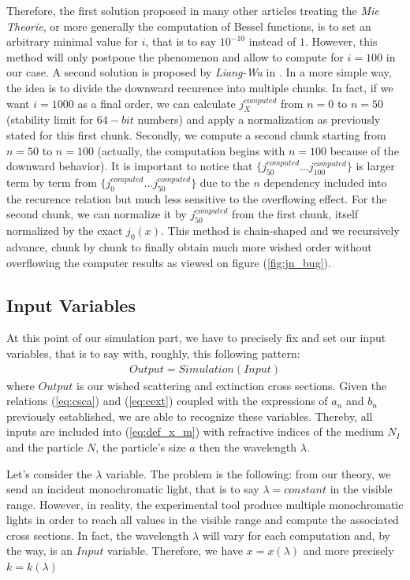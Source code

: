 \documentclass{article}
\numberwithin{equation}{section}
\begin{document}
Therefore, the first solution proposed in many other articles treating the \textit{Mie Theorie}, or more generally the computation of Bessel functions, is to set an arbitrary minimal value for $i$, that is to say $10^{-10}$ instead of $1$. However, this method will only postpone the phenomenon and allow to compute for $i=100$ in our case. A second solution is proposed by \textit{Liang-Wu} in \cite{liangwu}. In a more simple way, the idea is to divide the downward recurence into multiple chunks. In fact, if we want $i=1000$ as a final order, we can calculate $j^{computed}_{X}$ from $n=0$ to $n=50$ (stability limit for $64-bit$ numbers) and apply a normalization as previously stated for this first chunk. Secondly, we compute a second chunk starting from $n=50$ to $n=100$ (actually, the computation begins with $n=100$ because of the downward behavior). It is important to notice that $\{j^{computed}_{50}...j^{computed}_{100}\}$ is larger term by term from $\{j^{computed}_{0}...j^{computed}_{50}\}$ due to the $n$ dependency included into the recurence relation but much less sensitive to the overflowing effect. For the second chunk, we can normalize it by $j^{computed}_{50}$ from the first chunk, itself normalized by the exact $j_{0}(x)$. This method is chain-shaped and we recursively advance, chunk by chunk to finally obtain much more wished order without overflowing the computer results as viewed on figure (\ref{fig:jn_bug}).

\subsection{Input Variables}

At this point of our simulation part, we have to precisely fix and set our input variables, that is to say with, roughly, this following pattern:
\begin{align}
Output = Simulation(Input)
\end{align}
where $Output$ is our wished scattering and extinction cross sections. Given the relations (\ref{eq:csca}) and (\ref{eq:cext}) coupled with the expressions of $a_{n}$ and $b_{n}$ previously established, we are able to recognize these variables. Thereby, all inputs are included into (\ref{eq:def_x_m}) with refractive indices of the medium $N_{I}$ and the particle $N$, the particle's size $a$ then the wavelength $\lambda$.

Let's consider the $\lambda$ variable. The problem is the following: from our theory, we send an incident monochromatic light, that is to say $\lambda=constant$ in the visible range. However, in reality, the experimental tool produce multiple monochromatic lights in order to reach all values in the visible range and compute the associated cross sections. In fact, the wavelength $\lambda$ will vary for each computation and, by the way, is an $Input$ variable. Therefore, we have $x=x(\lambda)$ and more precisely $k=k(\lambda)$
\end{document}
